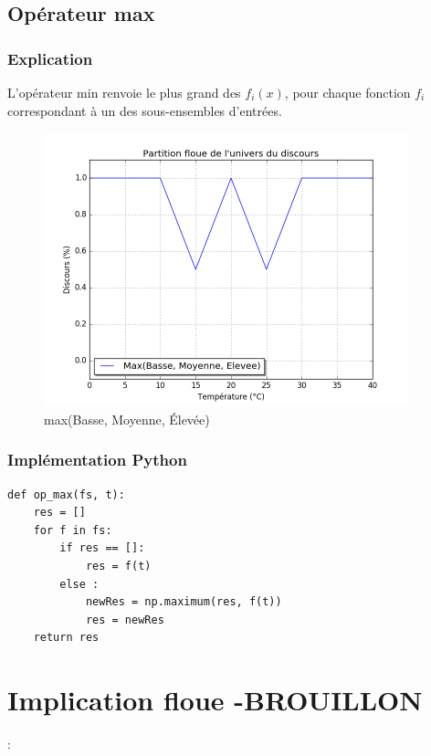 \documentclass[a4paper]{article}
\begin{document}
\subsection{Opérateur max}

\subsubsection{Explication}
L'opérateur min renvoie le plus grand des $f_i(x)$, pour chaque fonction $f_i$ correspondant à un des sous-ensembles d'entrées.

\begin{figure}[h]
\begin{center}
	\includegraphics[width=400px]{plot_test_max.png}
\end{center}
\caption{max(Basse, Moyenne, Élevée)}
\end{figure}

\subsubsection{Implémentation Python}
\begin{lstlisting}
def op_max(fs, t):
    res = []
    for f in fs:
        if res == []:
            res = f(t)
        else :
            newRes = np.maximum(res, f(t))
            res = newRes
    return res
\end{lstlisting}

\clearpage

\section{Implication floue -BROUILLON}:
\end{document}
